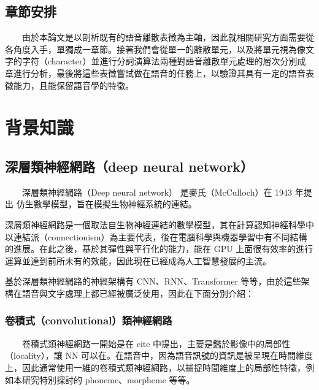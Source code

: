 \section{章節安排}

　　由於本論文是以剖析既有的語音離散表徵為主軸，因此就相關研究方面需要從各角度入手，單獨成一章節。接著我們會從單一的離散單元，以及將單元視為像文字的字符（character）並進行分詞演算法兩種對語音離散單元處理的層次分別成章進行分析，最後將這些表徵嘗試做在語音的任務上，以驗證其具有一定的語音表徵能力，且能保留語音學的特徵。






\chapter{背景知識}

\section{深層類神經網路（deep neural network）}

　　深層類神經網路（Deep neural network） 是麥氏（McCulloch）在 1943 年提出 \cite{mcculloch1943logical} 仿生數學模型，旨在模擬生物神經系統的連結。

    深層類神經網路是一個取法自生物神經連結的數學模型，其在計算認知神經科學中以連結派（connectionism）為主要代表，後在電腦科學與機器學習中有不同結構的進展。在此之後，基於其彈性與平行化的能力，能在 GPU 上面很有效率的進行運算並達到前所未有的效能，因此現在已經成為人工智慧發展的主流。

    基於深層類神經網路的神經架構有 CNN、RNN、Transformer 等等，由於這些架構在語音與文字處理上都已經被廣泛使用，因此在下面分別介紹：

\subsection{卷積式（convolutional）類神經網路}

　　卷積式類神經網路一開始是在 cite 中提出，主要是鑑於影像中的局部性（locality），讓 NN 可以在。在語音中，因為語音訊號的資訊是被呈現在時間維度上，因此通常使用一維的卷積式類神經網路，以捕捉時間維度上的局部性特徵，例如本研究特別探討的 phoneme、morpheme 等等。


